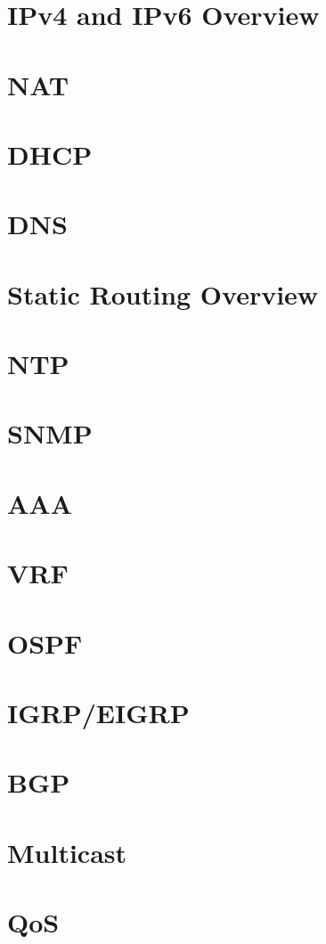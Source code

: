 \documentclass{article}
\begin{document}
\section*{IPv4 and IPv6 Overview}

\section*{NAT}

\section*{DHCP}

\section*{DNS}

\section*{Static Routing Overview}

\section*{NTP}

\section*{SNMP}

\section*{AAA}

\section*{VRF}

\section*{OSPF}

\section*{IGRP/EIGRP}

\section*{BGP}

\section*{Multicast}

\section*{QoS}
\end{document}
